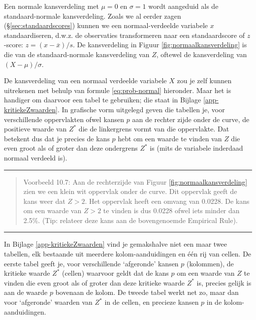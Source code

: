 \documentclass[
]{book}
\begin{document}
Een normale kansverdeling met \(\mu=0\) en \(\sigma=1\) wordt aangeduid als
de standaard-normale kansverdeling. Zoals we al eerder zagen
(§\ref{sec:standaardscores}) kunnen we een normaal-verdeelde
variabele \(x\) standaardiseren, d.w.z. de observaties transformeren naar
een standaardscore of \(z\)-score: \(z = (x-\overline{x})/s\).
De kansverdeling in
Figuur \ref{fig:normaalkansverdeling} is die van de standaard-normale
kansverdeling van \(Z\), oftewel de kansverdeling van \((X-\mu)/\sigma\).

De kansverdeling van een normaal verdeelde variabele \(X\) zou je zelf
kunnen uitrekenen met behulp van formule
\eqref{eq:prob-normal} hieronder. Maar het is handiger om daarvoor
een tabel te gebruiken; die staat in
Bijlage \ref{app-kritiekeZwaarden}.
In grafische vorm uitgelegd geven die tabellen je,
voor verschillende oppervlakten ofwel kansen \(p\) aan de rechter zijde onder de curve,
de positieve waarde van \(Z^*\) die de linkergrens vormt
van die oppervlakte. Dat betekent dus dat je precies de kans \(p\) hebt om
een waarde te vinden van \(Z\) die even groot als of groter dan deze
ondergrens \(Z^*\) is (mits de variabele inderdaad normaal verdeeld is).

\begin{center}\rule{0.5\linewidth}{0.5pt}\end{center}

\begin{quote}
Voorbeeld 10.7: Aan de rechterzijde van Figuur \ref{fig:normaalkansverdeling} zien we een klein wit oppervlak onder de curve. Dit oppervlak geeft de kans weer dat \(Z>2\). Het oppervlak heeft een omvang van 0.0228. De kans om een waarde van \(Z>2\) te vinden is dus 0.0228 ofwel iets minder dan 2.5\%. (Tip: relateer deze kans aan de bovengenoemde Empirical Rule).
\end{quote}

\begin{center}\rule{0.5\linewidth}{0.5pt}\end{center}

In Bijlage \ref{app-kritiekeZwaarden} vind je gemakshalve niet een maar twee
tabellen, elk bestaande uit meerdere kolom-aanduidingen en één rij van
cellen. De eerste tabel geeft je, voor verschillende `afgeronde' kansen
\(p\) (kolommen), de kritieke waarde \(Z^*\) (cellen) waarvoor geldt dat de
kans \(p\) om een waarde van \(Z\) te vinden die even groot als of groter
dan deze kritieke waarde \(Z^*\) is, precies gelijk is aan de waarde \(p\)
bovenaan de kolom. De tweede tabel werkt net zo, maar dan voor
`afgeronde' waarden van \(Z^*\) in de cellen, en precieze kansen \(p\) in de
kolom-aanduidingen.
\end{document}
